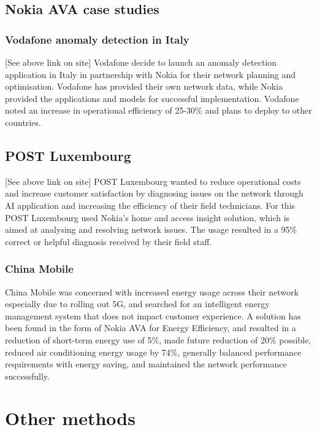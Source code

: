 \documentclass[a4paper,12pt]{report}
\begin{document}
	\subsection{Nokia AVA case studies}
	\subsubsection{Vodafone anomaly detection in Italy}
	[See above link on site]
	Vodafone decide to launch an anomaly detection application in Italy in partnership with Nokia for their network planning and optimisation. Vodafone has provided their own network data, while Nokia provided the applications and models for successful implementation. Vodafone noted an increase in operational efficiency of 25-30\% and plans to deploy to other countries.
	
	\subsection{POST Luxembourg} 
	[See above link on site]
	POST Luxembourg wanted to reduce operational costs and increase customer satisfaction by diagnosing issues on the network through AI application and increasing the efficiency of their field technicians.
	For this POST Luxembourg used Nokia's home and access insight solution, which is aimed at analysing and resolving network issues. The usage resulted in a 95\% correct or helpful diagnosis received by their field staff.
	
	\subsubsection{China Mobile}
	China Mobile was concerned with increased energy usage across their network especially due to rolling out 5G, and searched for an intelligent energy management system that does not impact customer experience.
	A solution has been found in the form of Nokia AVA for Energy Efficiency, and resulted in a reduction of short-term energy use of 5\%, made future reduction of 20\% possible, reduced air conditioning energy usage by 74\%, generally balanced performance requirements with energy saving, and maintained the network performance successfully.
	\closesection	
	\section{Other methods}
	\startsection
\end{document}
